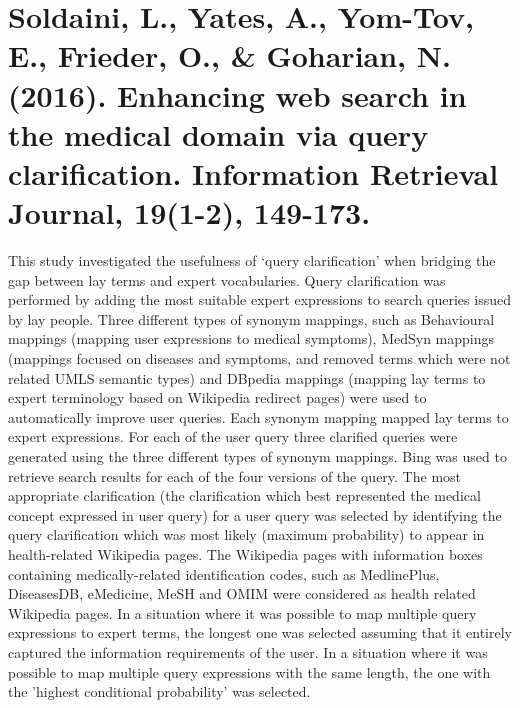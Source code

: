 \documentclass[]{article}
\begin{document}
\section{Soldaini, L., Yates, A., Yom-Tov, E., Frieder, O., \& Goharian, N. (2016). Enhancing web search in the medical domain via query clarification. Information Retrieval Journal, 19(1-2), 149-173.}

This study investigated the usefulness of ‘query clarification’ when bridging the gap between lay terms and expert vocabularies. Query clarification was performed by adding the most suitable expert expressions to search queries issued by lay people. Three different types of synonym mappings, such as Behavioural mappings (mapping user expressions to medical symptoms), MedSyn mappings (mappings focused on diseases and symptoms, and removed terms which were not related UMLS semantic types) and DBpedia  mappings (mapping lay terms to expert terminology based on Wikipedia redirect pages) were used to automatically improve user queries. Each synonym mapping mapped lay terms to expert expressions. For each of the user query three clarified queries were generated using the three different types of synonym mappings. Bing was used to retrieve search results for each of the four versions of the query. The most appropriate clarification (the clarification which best represented the medical concept expressed in user query) for a user query was selected by identifying the query clarification which was most likely (maximum probability) to appear in health-related Wikipedia pages. The Wikipedia pages with information boxes containing medically-related identification codes, such as MedlinePlus, DiseasesDB, eMedicine, MeSH and OMIM were considered as health related Wikipedia pages. In a situation where it was possible to map multiple query expressions to expert terms, the longest one was selected assuming that it entirely captured the information requirements of the user. In a situation where it was possible to map multiple query expressions with the same length, the one with the 'highest conditional probability' was selected.  
\end{document}
